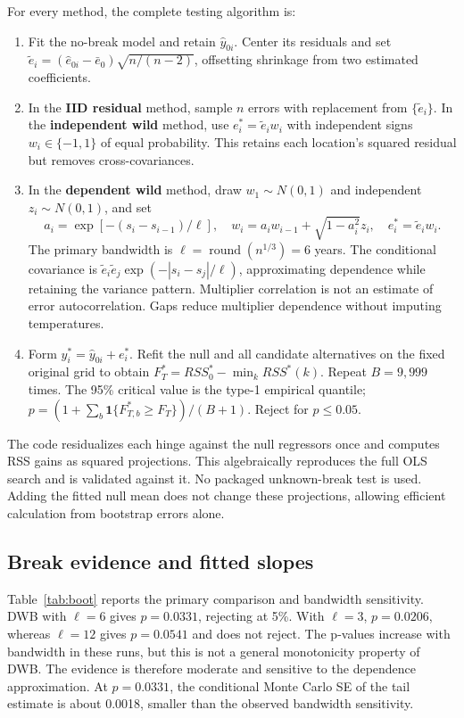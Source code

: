 \documentclass[11pt,a4paper]{article}
\begin{document}
For every method, the complete testing algorithm is:
\begin{enumerate}
\item Fit the no-break model and retain $\widehat y_{0i}$. Center its residuals and set $\widetilde e_i=(\widehat e_{0i}-\bar e_0)\sqrt{n/(n-2)}$, offsetting shrinkage from two estimated coefficients.
\item In the \textbf{IID residual} method, sample $n$ errors with replacement from $\{\widetilde e_i\}$. In the \textbf{independent wild} method, use $e_i^*=\widetilde e_iw_i$ with independent signs $w_i\in\{-1,1\}$ of equal probability. This retains each location's squared residual but removes cross-covariances.
\item In the \textbf{dependent wild} method, draw $w_1\sim N(0,1)$ and independent $z_i\sim N(0,1)$, and set
\[
 a_i=\exp[-(s_i-s_{i-1})/\ell],\quad w_i=a_iw_{i-1}+\sqrt{1-a_i^2}z_i,\quad e_i^*=\widetilde e_iw_i.
\]
The primary bandwidth is $\ell=\operatorname{round}(n^{1/3})=6$ years. The conditional covariance is $\widetilde e_i\widetilde e_j\exp(-|s_i-s_j|/\ell)$, approximating dependence while retaining the variance pattern. Multiplier correlation is not an estimate of error autocorrelation. Gaps reduce multiplier dependence without imputing temperatures.
\item Form $y_i^*=\widehat y_{0i}+e_i^*$. Refit the null and all candidate alternatives on the fixed original grid to obtain $F_T^*=RSS_0^*-\min_kRSS^*(k)$. Repeat $B=9,999$ times. The 95\% critical value is the type-1 empirical quantile; $p=(1+\sum_b\mathbf1\{F_{T,b}^*\geq F_T\})/(B+1)$. Reject for $p\leq0.05$.
\end{enumerate}
The code residualizes each hinge against the null regressors once and computes RSS gains as squared projections. This algebraically reproduces the full OLS search and is validated against it. No packaged unknown-break test is used. Adding the fitted null mean does not change these projections, allowing efficient calculation from bootstrap errors alone.

\subsection{Break evidence and fitted slopes}
Table~\ref{tab:boot} reports the primary comparison and bandwidth sensitivity. DWB with $\ell=6$ gives $p=0.0331$, rejecting at 5\%. With $\ell=3$, $p=0.0206$, whereas $\ell=12$ gives $p=0.0541$ and does not reject. The p-values increase with bandwidth in these runs, but this is not a general monotonicity property of DWB. The evidence is therefore moderate and sensitive to the dependence approximation. At $p=0.0331$, the conditional Monte Carlo SE of the tail estimate is about 0.0018, smaller than the observed bandwidth sensitivity.
\end{document}
